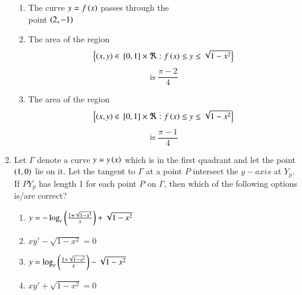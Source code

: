 \documentclass[journal,12pt,twocolumn,article]{IEEEtran}
\theoremstyle{remark}
\begin{document}
\begin{enumerate}[start = 6]
\begin{enumerate}
\item The curve $y=f\left(x\right)$ passes through the \\point $\left(2,-1\right)$
\item The area of the region 
\begin{align*}
\left\{\left(x,y\right) \in {}\left[0,1\right]\times\Re:f\left(x\right)\leq y \leq \sqrt{1-x^2}\right\} 
\end{align*}
$$\text{is} \;\frac{\pi-2}{4}$$
\item The area of the region 
\begin{align*}
\left\{\left(x,y\right) \in {}\left[0,1\right]\times\Re:f\left(x\right)\leq y \leq \sqrt{1-x^2}\right\}
\end{align*} 
$$\text{is}\; \frac{\pi-1}{4}$$
\end{enumerate}
\item Let $\Gamma$ denote a curve $y=y\left(x\right)$ which is in the first quadrant and let the point $\left(1,0\right)$ lie on it. Let the tangent to $\Gamma$ at a point $P$ intersect the $y-axis$ at $Y_p$. If $PY_p$ has length 1 for each point $P$ on $\Gamma$, then which of the following options is/are correct?
\hfill{}
\begin{enumerate}
\item $y=-\log_e{\left(\frac{1+\sqrt{1-x^2}}{x}\right)} + \sqrt{1-x^2}$
\item $xy\prime-\sqrt{1-x^2} = 0$
\item $y=\log_e{\left(\frac{1+\sqrt{1-x^2}}{x}\right)}-\sqrt{1-x^2}$
\item $xy\prime+\sqrt{1-x^2} = 0$
\end{enumerate}
\end{enumerate}
\end{document}
